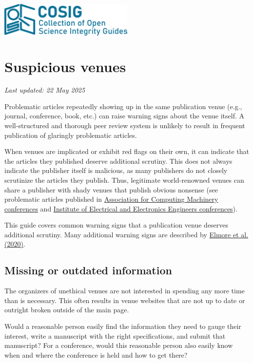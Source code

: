 \documentclass[letterpaper, 12pt]{article}
\begin{document}
\flushleft
\includegraphics[width=0.5\textwidth]{img/home/241017_final_logo_mockup.png}

\section*{Suspicious venues}
\textit{Last updated: 22 May 2025}

Problematic articles repeatedly showing up in the same publication venue (e.g., journal, conference, book, etc.) can raise warning signs about the venue itself. A well-structured and thorough peer review system is unlikely to result in frequent publication of glaringly problematic articles.

When venues are implicated or exhibit red flags on their own, it can indicate that the articles they published deserve additional scrutiny.
This does not always indicate the publisher itself is malicious, as many publishers do not closely scrutinize the articles they publish.
Thus, legitimate world-renowned venues can share a publisher with shady venues that publish obvious nonsense (see problematic articles published in \href{https://solalpirelli.github.io/2023/01/25/troubling-acm-venues.html}{Association for Computing Machinery conferences} and \href{https://deevybee.blogspot.com/2025/02/ieee-has-pseudoscience-problem.html}{Institute of Electrical and Electronics Engineers conferences}).

This guide covers common warning signs that a publication venue deserves additional scrutiny. Many additional warning signs are described by \href{https://doi.org/10.1177/0192623320920209}{Elmore et al. (2020)}.

\subsection*{Missing or outdated information}

The organizers of unethical venues are not interested in spending any more time than is necessary.
This often results in venue websites that are not up to date or outright broken outside of the main page.

Would a reasonable person easily find the information they need to gauge their interest,
write a manuscript with the right specifications, and submit that manuscript?
For a conference, would this reasonable person also easily know when and where the conference is held and how to get there?
\end{document}
